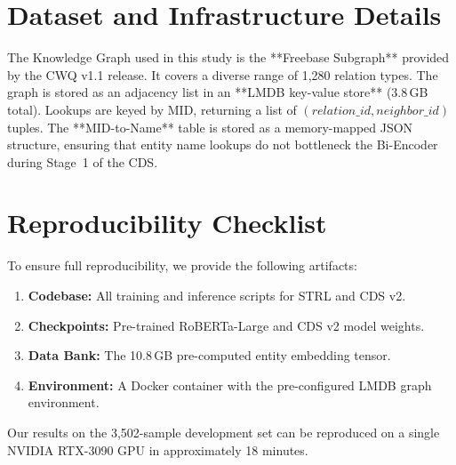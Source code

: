 \documentclass[11pt,a4paper]{article}
\begin{document}
\section{Dataset and Infrastructure Details}
\label{app:data}
The Knowledge Graph used in this study is the **Freebase Subgraph** provided
by the CWQ v1.1 release. It covers a diverse range of 1,280 relation types.
The graph is stored as an adjacency list in an **LMDB key-value store**
(3.8\,GB total).
Lookups are keyed by MID, returning a list of $(relation\_id, neighbor\_id)$
tuples.
The **MID-to-Name** table is stored as a memory-mapped JSON structure,
ensuring that entity name lookups do not bottleneck the Bi-Encoder during
Stage~1 of the CDS.

\section{Reproducibility Checklist}
\label{app:checklist}
To ensure full reproducibility, we provide the following artifacts:
\begin{enumerate}
    \item \textbf{Codebase:} All training and inference scripts for STRL and CDS v2.
    \item \textbf{Checkpoints:} Pre-trained RoBERTa-Large and CDS v2 model weights.
    \item \textbf{Data Bank:} The 10.8\,GB pre-computed entity embedding tensor.
    \item \textbf{Environment:} A Docker container with the pre-configured LMDB
          graph environment.
\end{enumerate}
Our results on the 3,502-sample development set can be reproduced on a
single NVIDIA RTX-3090 GPU in approximately 18 minutes.
\end{document}

